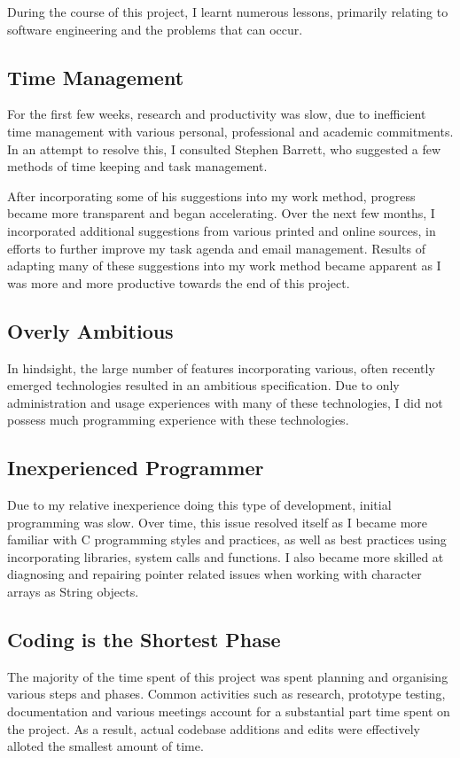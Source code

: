 
During the course of this project, I learnt numerous lessons, primarily
relating to software engineering and the problems that can occur.

\subsection{Time Management}

For the first few weeks, research and productivity was slow, due to
inefficient time management with various personal, professional and
academic commitments. In an attempt to resolve this, I consulted
Stephen Barrett, who suggested a few methods of time keeping and task
management.


After incorporating some of his suggestions into my work method,
progress became more transparent and began accelerating. Over the next
few months, I incorporated additional suggestions from various printed
and online sources, in efforts to further improve my task agenda and 
email management. Results of adapting many of these suggestions into my
work method became apparent as I was more and more productive towards
the end of this project.

\subsection{Overly Ambitious}

In hindsight, the large number of features incorporating various, often
recently emerged technologies resulted in an ambitious specification.
Due to only administration and usage experiences with many of these
technologies, I did not possess much  programming experience with these
technologies. 

\subsection{Inexperienced Programmer}

Due to my relative inexperience doing this type of development, initial
programming was slow. Over time, this issue resolved itself as I became
more familiar with C programming styles and practices, as well as best
practices using incorporating libraries, system calls and functions. I
also became more skilled at diagnosing and repairing pointer related 
issues when working with character arrays as String objects.

\subsection{Coding is the Shortest Phase}

The majority of the time spent of this project was spent planning and
organising various steps and phases. Common activities such as research,
prototype testing, documentation and various meetings account for a 
substantial part time spent on the project. As a result, actual codebase
additions and edits were effectively alloted the smallest amount of
time.

